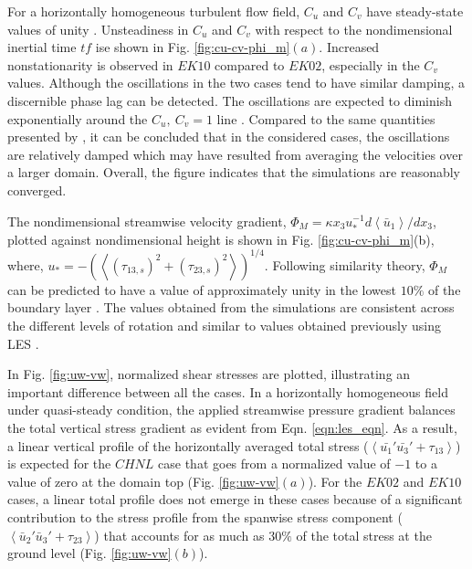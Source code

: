 \noindent For a horizontally homogeneous turbulent flow field, $C_u$ and $C_v$ have steady-state values of unity  \citep{book-garrat-blm}. Unsteadiness in $C_u$ and $C_v$ with respect to the nondimensional inertial time $tf$ ise shown in Fig.  \ref{fig:cu-cv-phi_m}$(a)$. Increased nonstationarity is observed in $EK10$ compared to $EK02$, especially in the $C_v$ values. Although the oscillations in the two cases tend to have similar damping, a discernible phase lag can be detected. The oscillations are expected to diminish  exponentially around the  $C_{u},\ C_{v}=1$ line \citep{book-garrat-blm}. Compared to the same quantities presented by \citet{andren_brown_qjrm_94}, it can be concluded that in the considered cases, the oscillations are relatively damped which may have resulted from averaging the velocities over a larger domain. Overall, the figure indicates that the simulations are reasonably converged. 

The nondimensional streamwise velocity gradient, $\Phi_M=\kappa x_3 u_*^{-1} d\left < \bar{u}_1 \right >/dx_3$, plotted against nondimensional height is shown in Fig. \ref{fig:cu-cv-phi_m}(b), where, $u_*= -(\left < (\tau_{13,s})^2 + ( \tau_{23,s})^2\right >)^{1/4}$. Following similarity theory, $\Phi_M$ can be predicted to have a value of approximately unity in the lowest $10\%$ of the boundary layer \citep{book-garrat-blm, stoll_blm_2006}. The values obtained from the simulations are consistent across the different levels of rotation and similar to values obtained previously using LES \citep{stoll_blm_2006,Bouzeid_pof_2005,andren_brown_qjrm_94}. 

In Fig. \ref{fig:uw-vw}, normalized shear stresses are plotted, illustrating an important difference between all the cases. In a horizontally homogeneous field under quasi-steady condition, the applied streamwise pressure gradient balances the total vertical stress gradient as evident from Eqn. \ref{eqn:les_eqn}. As a result, a linear vertical profile of the horizontally averaged total stress ($\left <\bar{u_1}'\bar{u_3}'+\tau_{13} \right>$)  is expected for the $CHNL$ case that goes from a normalized value of $-1$ to a value of zero at the domain top (Fig. \ref{fig:uw-vw}$(a)$). For the $EK02$ and $EK10$ cases, a linear total profile does not emerge in these cases because of a significant contribution to the stress profile from  the spanwise stress component ($\left <\bar{u}_{2}'\bar{u}_{3}'+\tau_{23} \right>$) that accounts for as much as $30\%$ of the total stress at the ground level (Fig. \ref{fig:uw-vw}$(b)$). 

